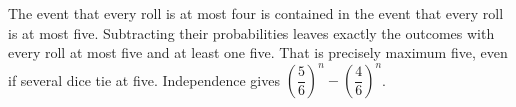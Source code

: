 The event that every roll is at most four is contained in the event that every roll is at most five. Subtracting their probabilities leaves exactly the outcomes with every roll at most five and at least one five. That is precisely maximum five, even if several dice tie at five. Independence gives $\boxed{\left(\dfrac{5}{6}\right)^n-\left(\dfrac{4}{6}\right)^n}$.

